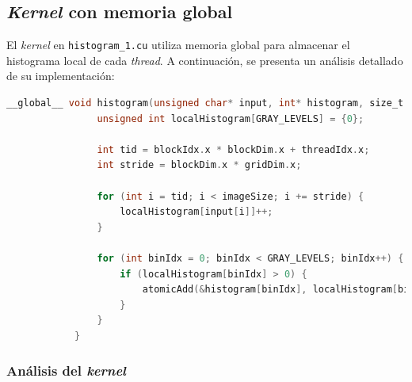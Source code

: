     \subsection{\textit{Kernel} con memoria global}
        
        El \textit{kernel} en \texttt{histogram\_1.cu} utiliza memoria global para almacenar el histograma local de cada \textit{thread}. A continuación, se presenta un análisis detallado de su implementación:
        
        \begin{lstlisting}[language=C, caption={\textit{Kernel} usando memoria global.}, gobble=12]
            __global__ void histogram(unsigned char* input, int* histogram, size_t imageSize) {
                unsigned int localHistogram[GRAY_LEVELS] = {0};
            
                int tid = blockIdx.x * blockDim.x + threadIdx.x;
                int stride = blockDim.x * gridDim.x;
            
                for (int i = tid; i < imageSize; i += stride) {
                    localHistogram[input[i]]++;
                }
            
                for (int binIdx = 0; binIdx < GRAY_LEVELS; binIdx++) {
                    if (localHistogram[binIdx] > 0) {
                        atomicAdd(&histogram[binIdx], localHistogram[binIdx]);
                    }
                }
            }
        \end{lstlisting}

        \subsubsection{Análisis del \textit{kernel}}

